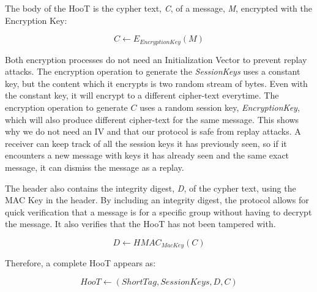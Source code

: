 The body of the HooT is the cypher text, \textit{C}, of a message, \textit{M}, encrypted with the Encryption Key:

\begin{equation*}
	C \leftarrow E_{\mathit{EncryptionKey}}\left(M\right)
\end{equation*}

Both encryption processes do not need an Initialization Vector to prevent replay attacks. The encryption operation to generate the \textit{SessionKeys} uses a constant key, but the content which it encrypts is two random stream of bytes. Even with the constant key, it will encrypt to a different cipher-text everytime. The encryption operation to generate $C$ uses a random session key, \textit{EncryptionKey}, which will also produce different cipher-text for the same message. This shows why we do not need an IV and that our protocol is safe from replay attacks. A receiver can keep track of all the session keys it has previously seen, so if it encounters a new message with keys it has already seen and the same exact message, it can dismiss the message as a replay.

The header also contains the integrity digest, \textit{D}, of the cypher text, using the MAC Key in the header. By including an integrity digest, the protocol allows for quick verification that a message is for a specific group without having to decrypt the message. It also verifies that the HooT has not been tampered with. 

\begin{equation*}
	D \leftarrow \mathit{HMAC}_{\mathit{MacKey}}\left(C\right)
\end{equation*}

Therefore, a complete HooT appears as:

\begin{equation*}
	\mathit{HooT} \leftarrow \left(\mathit{ShortTag},\mathit{SessionKeys},D,C\right)
\end{equation*}
